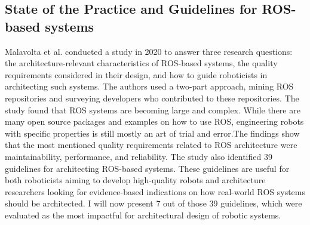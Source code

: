 \documentclass[%
paper=A4,               %
twoside=true,           %
openright,              %
11pt,                   %
bibliography=totoc,     %
titlepage=on,           %
DIV=12,                 %
BCOR=1.5cm,             %
parskip=half,            %
final
]{scrreprt}
\begin{document}
	\subsection{State of the Practice and Guidelines for ROS-based systems}
	Malavolta et al. \autocite{malavoltaHowYouArchitect2020} conducted a study in 2020 to answer three research questions: the architecture-relevant characteristics of ROS-based systems, the quality requirements considered in their design, and how to guide roboticists in architecting such systems. The authors used a two-part approach, mining ROS repositories and surveying developers who contributed to these repositories. The study found that ROS systems are becoming large and complex. While there are many open source packages and examples on how to use ROS, engineering robots with specific properties is still mostly an art of trial and error.The findings show that the most mentioned quality requirements related to ROS architecture were maintainability, performance, and reliability. The study also identified 39 guidelines for architecting ROS-based systems. These guidelines are useful for both roboticists aiming to develop high-quality robots and architecture researchers looking for evidence-based indications on how real-world ROS systems should be architected. I will now present 7 out of those 39 guidelines, which were evaluated as the most impactful for architectural design of robotic systems.
	\autocite{malavoltaHowYouArchitect2020}
\end{document}
